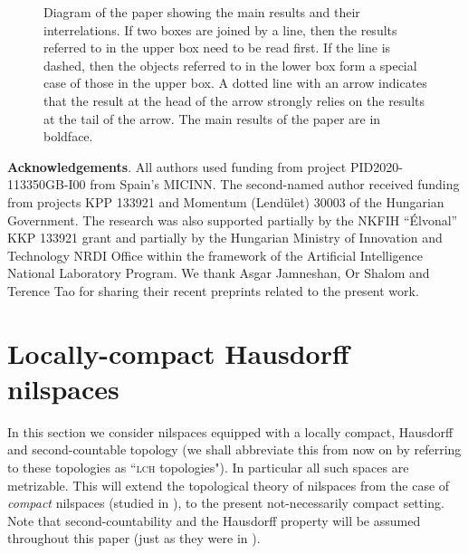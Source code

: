 \documentclass[a4paper,12pt,reqno]{amsart}
\theoremstyle{definition}
\begin{document}
\begin{figure}
\vspace*{-1cm}\caption{\footnotesize{Diagram of the paper showing the main results and their interrelations. If two boxes are joined by a line, then the results referred to in the upper box need to be read first. If the line is dashed, then the objects referred to in the lower box form a special case of those in the upper box. A dotted line with an arrow indicates that the result at the head of the arrow strongly relies on the results at the tail of the arrow. The main results of the paper are in boldface.}}
\end{figure}



 

\noindent \textbf{Acknowledgements}. All authors used funding from project PID2020-113350GB-I00 from Spain’s MICINN.
The second-named author received funding from projects KPP 133921 and Momentum
(Lend\"ulet) 30003 of the Hungarian Government. The research was also supported partially
by the NKFIH ``\'Elvonal” KKP 133921 grant and partially by the Hungarian Ministry of
Innovation and Technology NRDI Office within the framework of the Artificial Intelligence
National Laboratory Program. We thank Asgar Jamneshan, Or Shalom and Terence Tao for sharing their recent preprints \cite{JST1,JST2}  related to the present work.





\section{Locally-compact Hausdorff nilspaces}\label{sec:lch}

In this section we consider nilspaces equipped with a  locally compact, Hausdorff and second-countable topology (we shall abbreviate this from now on by referring to these topologies as ``\textsc{lch} topologies"). In particular all such spaces are metrizable. This will extend the topological theory of nilspaces from the case of  \emph{compact} nilspaces (studied in \cite{CamSzeg,Cand:Notes2}), to the present not-necessarily compact setting. Note that second-countability and the Hausdorff property will be assumed throughout this paper (just as they were in \cite{CamSzeg,Cand:Notes2}).
\end{document}
